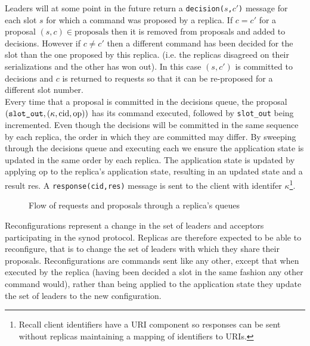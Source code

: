 Leaders will at some point in the future return a \texttt{decision($s$,$c'$)} message for each slot $s$ for which a command was proposed by a replica. If $c = c'$ for a proposal $\left(s,c\right) \in \textrm{proposals}$ then it is removed from proposals and added to decisions. However if $c \neq c'$ then a different command has been decided for the slot than the one proposed by this replica. (i.e. the replicas disagreed on their serializations and the other has won out). In this case $\left(s,c'\right)$ is committed to decisions and $c$ is returned to requests so that it can be re-proposed for a different slot number. \\

Every time that a proposal is committed in the decisions queue, the proposal $\left( \textrm{\texttt{slot\_out}}, \left( \kappa, \textrm{cid}, \textrm{op} \right) \right)$ has its command executed, followed by \texttt{slot\_out} being incremented. Even though the decisions will be committed in the same sequence by each replica, the order in which they are committed may differ. By sweeping through the decisions queue and executing each we ensure the application state is updated in the same order by each replica. The application state is updated by applying op to the replica's application state, resulting in an updated state and a result res. A \texttt{response(cid,res)} message is sent to the client with identifer $\kappa$\footnote{Recall client identifiers have a URI component so responses can be sent without replicas maintaining a mapping of identifiers to URIs.}. \\

\begin{figure}
  \scalebox{0.7}{
    }
  \caption{Flow of requests and proposals through a replica's queues}
  \label{fig:replica-queues}
\end{figure}
  
Reconfigurations represent a change in the set of leaders and acceptors participating in the synod protocol. Replicas are therefore expected to be able to reconfigure, that is to change the set of leaders with which they share their proposals. Reconfigurations are commands sent like any other, except that when executed by the replica (having been decided a slot in the same fashion any other command would), rather than being applied to the application state they update the set of leaders to the new configuration. \\

